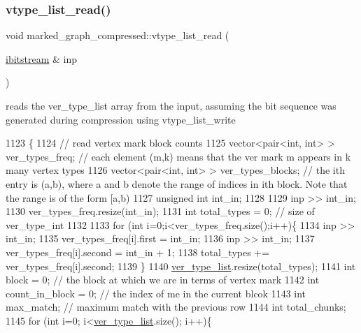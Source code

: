 \subsubsection{\texorpdfstring{vtype\+\_\+list\+\_\+read()}{vtype\_list\_read()}}
{\footnotesize\ttfamily void marked\+\_\+graph\+\_\+compressed\+::vtype\+\_\+list\+\_\+read (\begin{DoxyParamCaption}\item[{\hyperlink{classibitstream}{ibitstream} \&}]{inp }\end{DoxyParamCaption})}



reads the ver\+\_\+type\+\_\+list array from the input, assuming the bit sequence was generated during compression using vtype\+\_\+list\+\_\+write 


\begin{DoxyCode}
1123                                                             \{
1124   \textcolor{comment}{// read vertex mark block counts}
1125   vector<pair<int, int> > ver\_types\_freq; \textcolor{comment}{// each element (m,k) means that the ver mark m appears in k many
       vertex types}
1126   vector<pair<int, int> > ver\_types\_blocks; \textcolor{comment}{// the ith entry is (a,b), where a and b denote the range of
       indices in ith block. Note that the range is of the form [a,b)}
1127   \textcolor{keywordtype}{unsigned} \textcolor{keywordtype}{int} int\_in;
1128 
1129   inp >> int\_in;
1130   ver\_types\_freq.resize(int\_in);
1131   \textcolor{keywordtype}{int} total\_types = 0; \textcolor{comment}{// size of ver\_type\_int}
1132   
1133   \textcolor{keywordflow}{for} (\textcolor{keywordtype}{int} i=0;i<ver\_types\_freq.size();i++)\{
1134     inp >> int\_in;
1135     ver\_types\_freq[i].first = int\_in;
1136     inp >> int\_in;
1137     ver\_types\_freq[i].second  = int\_in + 1;
1138     total\_types += ver\_types\_freq[i].second;
1139   \}
1140   \hyperlink{classmarked__graph__compressed_af2e3e55223d436628a02758dfae88493}{ver\_type\_list}.resize(total\_types);
1141   \textcolor{keywordtype}{int} block = 0; \textcolor{comment}{// the block at which we are in terms of vertex mark}
1142   \textcolor{keywordtype}{int} count\_in\_block = 0; \textcolor{comment}{// the index of me in the current blcok}
1143   \textcolor{keywordtype}{int} max\_match; \textcolor{comment}{// maximum match with the previous row}
1144   \textcolor{keywordtype}{int} total\_chunks; 
1145   \textcolor{keywordflow}{for} (\textcolor{keywordtype}{int} i=0; i<\hyperlink{classmarked__graph__compressed_af2e3e55223d436628a02758dfae88493}{ver\_type\_list}.size(); i++)\{

\end{DoxyCode}
